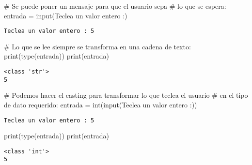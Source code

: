 \documentclass[
  letterpaper,
  DIV=11,
  numbers=noendperiod]{scrreprt}
\newenvironment{Shaded}{\begin{snugshade}}{\end{snugshade}}
\newcommand{\BuiltInTok}[1]{\textcolor[rgb]{0.00,0.23,0.31}{#1}}
\newcommand{\CommentTok}[1]{\textcolor[rgb]{0.37,0.37,0.37}{#1}}
\newcommand{\NormalTok}[1]{\textcolor[rgb]{0.00,0.23,0.31}{#1}}
\newcommand{\OperatorTok}[1]{\textcolor[rgb]{0.37,0.37,0.37}{#1}}
\newcommand{\StringTok}[1]{\textcolor[rgb]{0.13,0.47,0.30}{#1}}
\begin{document}
\begin{Shaded}
\begin{Highlighting}[]
\CommentTok{\# Se puede poner un mensaje para que el usuario sepa}
\CommentTok{\# lo que se espera:}
\NormalTok{entrada }\OperatorTok{=} \BuiltInTok{input}\NormalTok{(}\StringTok{\textquotesingle{}Teclea un valor entero :\textquotesingle{}}\NormalTok{)}
\end{Highlighting}
\end{Shaded}

\begin{verbatim}
Teclea un valor entero : 5
\end{verbatim}

\begin{Shaded}
\begin{Highlighting}[]
\CommentTok{\# Lo que se lee siempre se transforma en una cadena de texto:}
\BuiltInTok{print}\NormalTok{(}\BuiltInTok{type}\NormalTok{(entrada))}
\BuiltInTok{print}\NormalTok{(entrada)}
\end{Highlighting}
\end{Shaded}

\begin{verbatim}
<class 'str'>
5
\end{verbatim}

\begin{Shaded}
\begin{Highlighting}[]
\CommentTok{\# Podemos hacer el \textquotesingle{}casting\textquotesingle{} para transformar lo que teclea el usuario}
\CommentTok{\# en el tipo de dato requerido:}
\NormalTok{entrada }\OperatorTok{=} \BuiltInTok{int}\NormalTok{(}\BuiltInTok{input}\NormalTok{(}\StringTok{\textquotesingle{}Teclea un valor entero :\textquotesingle{}}\NormalTok{))}
\end{Highlighting}
\end{Shaded}

\begin{verbatim}
Teclea un valor entero : 5
\end{verbatim}

\begin{Shaded}
\begin{Highlighting}[]
\BuiltInTok{print}\NormalTok{(}\BuiltInTok{type}\NormalTok{(entrada))}
\BuiltInTok{print}\NormalTok{(entrada)}
\end{Highlighting}
\end{Shaded}

\begin{verbatim}
<class 'int'>
5
\end{verbatim}
\end{document}
